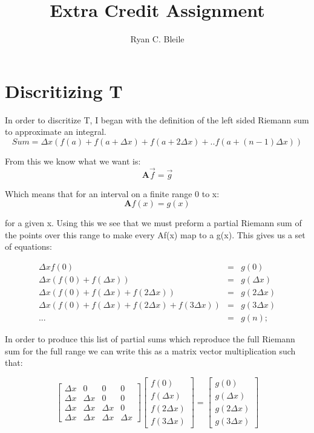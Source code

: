 \documentclass[12pt]{article}
\title{Extra Credit Assignment}
\author{Ryan C. Bleile}
\begin{document}
\maketitle
\newpage

\section*{Discritizing T}

In order to discritize T, I began with the definition of the left sided Riemann sum to approximate an integral.\\

$$ Sum = \Delta x ( f(a) + f(a + \Delta x) + f(a + 2 \Delta x) + .. f(a + (n-1) \Delta x)) $$

From this we know what we want is:\\

\[ \textbf{A} \vec{f} = \vec{g} \]

Which means that for an interval on a finite range 0 to x:\\

\[ \textbf{A} f(x) = g(x) \]

for a given x. Using this we see that we must preform a partial Riemann sum of the points over this range to make every Af(x) map to a g(x). This gives us a set of equations:

\begin{eqnarray*}
 \Delta x f(0)&=& g(0)\\
 \Delta x (f(0) + f(\Delta x)) &=& g(\Delta x)\\
 \Delta x (f(0) + f(\Delta x) + f(2 \Delta x)) &=& g(2 \Delta x)\\
 \Delta x (f(0) + f(\Delta x) + f(2 \Delta x) + f(3 \Delta x)) &=& g(3 \Delta x)\\
 ... &=& g(n);
\end{eqnarray*} 

In order to produce this list of partial sums which reproduce the full Riemann sum for the full range we can write this as a matrix vector multiplication such that:

\[
\begin{bmatrix}
\Delta x & 0 & 0 & 0\\
\Delta x & \Delta x & 0 & 0\\
\Delta x & \Delta x & \Delta x & 0\\
\Delta x & \Delta x & \Delta x & \Delta x
\end{bmatrix}
\begin{bmatrix}
f(0)\\
f(\Delta x)\\
f(2 \Delta x)\\
f(3 \Delta x)
\end{bmatrix}
=
\begin{bmatrix}
g(0)\\
g(\Delta x)\\
g(2 \Delta x)\\
g(3 \Delta x)
\end{bmatrix}\]
\end{document}
